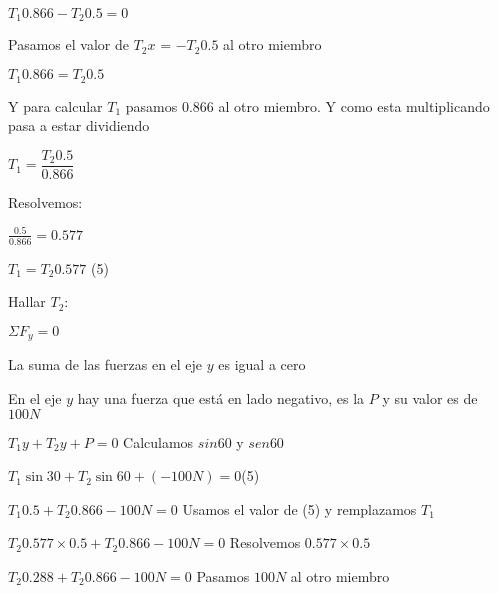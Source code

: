 \documentclass{article}
\begin{document}
\qquad $T_1 0.866 - T_2 0.5 = 0$\newline

Pasamos el valor de $T_2x$ = $-T_2 0.5$ al otro miembro\newline

\qquad $T_1 0.866 = T_2 0.5$\newline

Y para calcular $T_1$ pasamos $0.866$ al otro miembro. Y como esta multiplicando pasa a estar dividiendo\newline

\qquad $T_1 = \dfrac{T_2 0.5}{0.866}$\newline

Resolvemos:\newline

\qquad$\frac{0.5}{0.866} = 0.577$\newline

\qquad $T_1 = T_2 0.577$ \qquad (5) \newline

Hallar $T_2$:\newline

\qquad $\Sigma F_y = 0$\newline

La suma de las fuerzas en el eje $y$ es igual a cero\newline

En el eje $y$ hay una fuerza que est\'a en lado negativo, es la $P$ y su valor es de $100N$

$T_1y + T_2y + P = 0$\newline\newline
Calculamos $sin 60$ y $sen 60$\newline

$T_1 \sin 30 + T_2 \sin 60 + (-100 N) = 0$\qquad (5)\newline

$T_1 0.5 + T_2 0.866 -100 N = 0$\newline\newline
Usamos el valor de (5) y remplazamos $T_1$\newline

$T_2 0.577 \times 0.5 + T_2 0.866 - 100 N = 0$\newline\newline
Resolvemos $0.577 \times 0.5$\newline

$T_2 0.288 + T_2 0.866 - 100 N = 0$\newline\newline
Pasamos $100 N$ al otro miembro\newline
\end{document}
